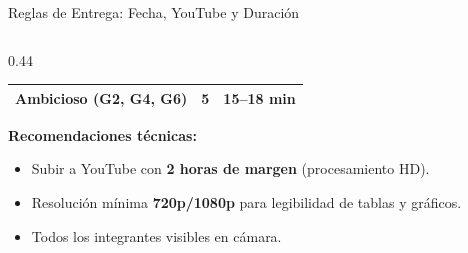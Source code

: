 \documentclass[aspectratio=169, 10pt]{beamer}
\begin{document}
\begin{frame}{Reglas de Entrega: Fecha, YouTube y Duraci\'on}
\begin{columns}[T]
\begin{column}{0.44\textwidth}
\begin{center}
\begin{tabular}{l c c}
        Ambicioso (G2, G4, G6) & 5 & \textbf{15--18 min} \\
        \bottomrule
      \end{tabular}
      \end{center}
      \renewcommand{\arraystretch}{1.0}
      \vspace{4pt}
      {\small\textbf{Recomendaciones t\'ecnicas:}}
      \begin{itemize}\setlength{\itemsep}{2pt}
        \footnotesize
        \item Subir a YouTube con \textbf{2 horas de margen} (procesamiento HD).
        \item Resoluci\'on m\'inima \textbf{720p/1080p} para legibilidad de tablas y gr\'aficos.
        \item Todos los integrantes visibles en c\'amara.
      \end{itemize}
    \end{column}
  \end{columns}
\end{frame}
\end{document}
